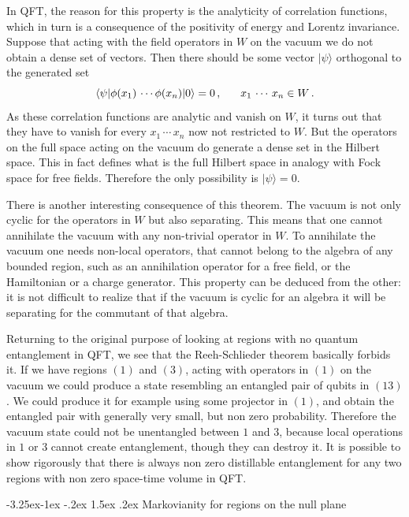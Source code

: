 \documentclass[11pt]{article}
\makeatletter
\renewcommand\subsection{\@startsection{subsection}{2}{\z@}%
                                   {-3.25ex\@plus -1ex \@minus -.2ex}%
                                     {1.5ex \@plus .2ex}%
                                     {\normalfont\bfseries}}
\numberwithin{equation}{section}
\newcommand{\be}{\begin{equation}}
\newcommand{\ee}{\end{equation}}
\makeatother
\begin{document}
In QFT, the reason for this property is the analyticity of correlation functions, which in turn is a consequence of the positivity of energy and Lorentz invariance. Suppose that acting with the field operators in $W$ on the vacuum we do not obtain a dense set of vectors. Then there should be some vector $|\psi\rangle$ orthogonal to the generated set
\be 
\langle \psi|\phi(x_1)\,\cdots \phi(x_n) |0\rangle=0\,,\hspace{.6cm} x_1\,\cdots\,x_n\in W\,. 
 \ee
As these correlation functions are analytic and vanish on $W$, it turns out that they have to vanish for every $x_1\,\cdots\,x_n$ now not restricted to $W$. But the operators on the full space acting on the vacuum do generate a dense set in the Hilbert space. This in fact defines what is the full Hilbert space in analogy with Fock space for free fields. Therefore the only possibility is $|\psi\rangle=0$.   


There is another interesting consequence of this theorem. The vacuum is not only cyclic for the operators in $W$ but also separating. This means that one cannot annihilate the vacuum with any non-trivial operator in $W$. To annihilate the vacuum one needs non-local operators, that cannot belong to the algebra of any bounded region, such as an annihilation operator for a free field, or the Hamiltonian or a charge generator. This property can be deduced from the other: it is not difficult to realize that if the vacuum is cyclic for an algebra it will be separating for the commutant of that algebra.  
 
Returning to the original purpose of looking at regions with no quantum entanglement in QFT, we see that the Reeh-Schlieder theorem basically forbids it. If we have regions $(1)$ and $(3)$, acting with operators in $(1)$ on the vacuum we could produce a state resembling an entangled pair of qubits in $(13)$. We could produce it for example using some projector in $(1)$, and obtain the entangled pair with generally very small, but non zero probability. Therefore the vacuum state could not be unentangled between $1$ and $3$, because local operations in $1$ or $3$ cannot create entanglement, though they can destroy it. It is possible to show rigorously that there is always non zero distillable entanglement for any two regions with non zero space-time volume in QFT.



\subsection{Markovianity for regions on the null plane}
\end{document}

